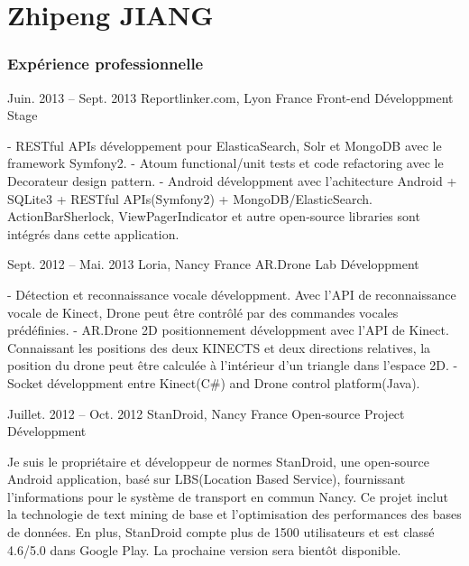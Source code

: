 \documentclass{tccv}
\begin{document}
\part{Zhipeng JIANG}

\section{Expérience professionnelle}

\begin{eventlist}

\item{Juin. 2013 -- Sept. 2013}
     {Reportlinker.com, Lyon France}
     {Front-end Développment Stage}

- RESTful APIs développement pour ElasticaSearch, Solr et MongoDB avec le framework Symfony2. 
\newline
- Atoum functional/unit tests et code refactoring avec le Decorateur design pattern.
\newline
- Android développment avec l'achitecture Android + SQLite3 + RESTful APIs(Symfony2) + MongoDB/ElasticSearch. ActionBarSherlock, ViewPagerIndicator et autre open-source libraries sont intégrés dans cette application.

\item{Sept. 2012 -- Mai. 2013}
     {Loria, Nancy France}
     {AR.Drone Lab Développment}

- Détection et reconnaissance vocale développment. Avec l'API de reconnaissance vocale de Kinect, Drone peut être contrôlé par des commandes vocales prédéfinies.
\newline
- AR.Drone 2D positionnement développment avec l'API de Kinect. Connaissant les positions des deux KINECTS et deux directions relatives, la position du drone peut être calculée à l'intérieur d'un triangle dans l'espace 2D.
\newline
- Socket développment entre Kinect(C\#) and Drone control platform(Java).


\item{Juillet. 2012 -- Oct. 2012}
     {StanDroid, Nancy France}
     {Open-source Project Développment}

Je suis le propriétaire et développeur de normes StanDroid, une open-source Android application, basé sur LBS(Location Based Service), fournissant l'informations pour le système de transport en commun Nancy. Ce projet inclut la technologie de text mining de base et l'optimisation des performances des bases de données. En plus, StanDroid compte plus de 1500 utilisateurs et est classé 4.6/5.0 dans Google Play. La prochaine version sera bientôt disponible.


\end{eventlist}
\end{document}
